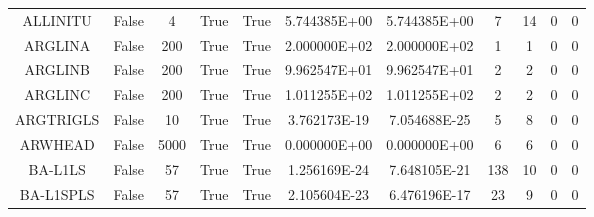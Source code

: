 \begin{longtable}{ccccccccccc}
	\cellcolor{default1} ALLINITU& \cellcolor{default1} False& \cellcolor{default1} 4& \cellcolor{default1} True& \cellcolor{default1} True& \cellcolor{best} 5.744385E+00& \cellcolor{ok} 5.744385E+00& \cellcolor{best} 7& \cellcolor{ok} 14& \cellcolor{default1} 0& \cellcolor{default1} 0\\
	\cellcolor{default2} ARGLINA& \cellcolor{default2} False& \cellcolor{default2} 200& \cellcolor{default2} True& \cellcolor{default2} True& \cellcolor{best} 2.000000E+02& \cellcolor{best} 2.000000E+02& \cellcolor{best} 1& \cellcolor{best} 1& \cellcolor{default2} 0& \cellcolor{default2} 0\\
	\cellcolor{default1} ARGLINB& \cellcolor{default1} False& \cellcolor{default1} 200& \cellcolor{default1} True& \cellcolor{default1} True& \cellcolor{best} 9.962547E+01& \cellcolor{ok} 9.962547E+01& \cellcolor{best} 2& \cellcolor{best} 2& \cellcolor{default1} 0& \cellcolor{default1} 0\\
	\cellcolor{default2} ARGLINC& \cellcolor{default2} False& \cellcolor{default2} 200& \cellcolor{default2} True& \cellcolor{default2} True& \cellcolor{best} 1.011255E+02& \cellcolor{ok} 1.011255E+02& \cellcolor{best} 2& \cellcolor{best} 2& \cellcolor{default2} 0& \cellcolor{default2} 0\\
	\cellcolor{default1} ARGTRIGLS& \cellcolor{default1} False& \cellcolor{default1} 10& \cellcolor{default1} True& \cellcolor{default1} True& \cellcolor{ok} 3.762173E-19& \cellcolor{best} 7.054688E-25& \cellcolor{best} 5& \cellcolor{ok} 8& \cellcolor{default1} 0& \cellcolor{default1} 0\\
	\cellcolor{default2} ARWHEAD& \cellcolor{default2} False& \cellcolor{default2} 5000& \cellcolor{default2} True& \cellcolor{default2} True& \cellcolor{best} 0.000000E+00& \cellcolor{best} 0.000000E+00& \cellcolor{best} 6& \cellcolor{best} 6& \cellcolor{default2} 0& \cellcolor{default2} 0\\
	\cellcolor{default1} BA-L1LS& \cellcolor{default1} False& \cellcolor{default1} 57& \cellcolor{default1} True& \cellcolor{default1} True& \cellcolor{best} 1.256169E-24& \cellcolor{ok} 7.648105E-21& \cellcolor{poor} 138& \cellcolor{best} 10& \cellcolor{default1} 0& \cellcolor{default1} 0\\
	\cellcolor{default2} BA-L1SPLS& \cellcolor{default2} False& \cellcolor{default2} 57& \cellcolor{default2} True& \cellcolor{default2} True& \cellcolor{best} 2.105604E-23& \cellcolor{ok} 6.476196E-17& \cellcolor{poor} 23& \cellcolor{best} 9& \cellcolor{default2} 0& \cellcolor{default2} 0\\

\end{longtable}
